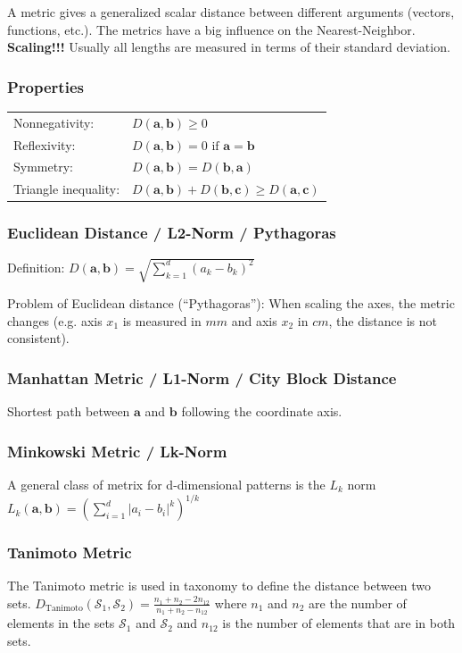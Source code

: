     A metric gives a generalized scalar distance between different arguments (vectors, functions, etc.). 
    The metrics have a big influence on the Nearest-Neighbor. \textbf{Scaling!!!}
    Usually all lengths are measured in terms of their standard deviation.
  
  \begin{multicols}{2}

    
    \subsubsection{Properties}
    \begin{tabular}{ll}
      Nonnegativity: &$D(\bm a, \bm b) \geq 0$  \\
      Reflexivity:   &$D(\bm a, \bm b) = 0 \text{ if } \bm a = \bm b$\\
      Symmetry:      &$D(\bm a, \bm b)=D(\bm b, \bm a)$  \\
      Triangle inequality: & $D(\bm a, \bm b) + D(\bm b, \bm c) \geq D(\bm a, \bm c)$
    \end{tabular}
    
    \subsubsection{Euclidean Distance / L2-Norm / Pythagoras}
      Definition: $D(\bm a, \bm b) = \sqrt{\sum\limits_{k=1}^d (a_k - b_k)^2}$
      
      Problem of Euclidean distance (``Pythagoras''): When scaling the axes, the metric changes (e.g. 
      axis $x_1$ is measured in $mm$ and axis $x_2$ in $cm$, the distance is not consistent).
      
      
    \subsubsection{Manhattan Metric / L1-Norm / City Block Distance}
      Shortest path between $\bm a$ and $\bm b$ following the coordinate axis.
    
    \subsubsection{Minkowski Metric / Lk-Norm}
	A general class of metrix for d-dimensional patterns is the $L_k$ norm
	$L_k(\mathbf{a},\mathbf{b}) = \left(\sum\limits_{i=1}^{d} \left| a_i-b_i \right|^k \right)^{1/k}$
    
    \subsubsection{Tanimoto Metric}
	The Tanimoto metric is used in taxonomy to define the distance between two sets.
	$D_{\mathrm{Tanimoto}}(\mathcal{S}_1,\mathcal{S}_2) = \frac{n_1 + n_2 - 2 n_{12}}{n_1 + n_2 - n_{12}}$
	where $n_1$ and $n_2$ are the number of elements in the sets $\mathcal{S}_1$ and $\mathcal{S}_2$ 
	and $n_{12}$ is the number of elements that are in both sets.
    

\end{multicols}
